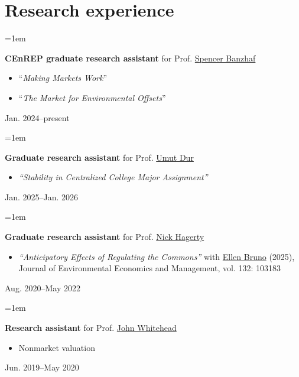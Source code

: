 \documentclass[12pt]{article}
\newenvironment{highlightsforbulletentries}{
	\begin{itemize}[
		topsep=0.10 cm,
		partopsep=0pt,
		leftmargin=20pt,
		]
	\setlength{\parsep}{0.10cm}\setlength{\itemsep}{-2pt}
	}{
	\end{itemize}
}
\newenvironment{twocolentry}[2][]{%
	\par\noindent\def\secondColumn{#2}%
	\begin{minipage}[t]{\linewidth-5.1cm}\raggedright\hangindent=1em\hangafter=1\relax%
	}
	{%
		\end{minipage}\hfill%
		\begin{minipage}[t]{5cm}\raggedleft\secondColumn\end{minipage}\par\smallskip
	}
\begin{document}
\section{Research experience}

\begin{twocolentry}
    {Jan. 2024--present}
    \textbf{CEnREP graduate research assistant} for Prof. \href{https://spencerbanzhaf.wordpress.ncsu.edu/}{Spencer Banzhaf}
    \begin{highlightsforbulletentries}
        \item ``\emph{Making Markets Work}''
        \item ``\emph{The Market for Environmental Offsets}''
    \end{highlightsforbulletentries}
\end{twocolentry}


\begin{twocolentry}
    {Jan. 2025--Jan. 2026}
    \textbf{Graduate research assistant} for Prof. \href{https://sites.google.com/site/umutdur/home}{Umut Dur}
    \begin{highlightsforbulletentries}
        \item \emph{``Stability in Centralized College Major Assignment''}
    \end{highlightsforbulletentries}
\end{twocolentry}

\begin{twocolentry}
    {Aug. 2020--May 2022}
    \textbf{Graduate research assistant} for Prof. \href{https://www.nickhagerty.com/}{Nick Hagerty}
    \begin{highlightsforbulletentries}
        \item \emph{``Anticipatory Effects of Regulating the Commons''} with \href{https://ellen-bruno.com/}{Ellen Bruno} (2025), Journal of Environmental Economics and Management, vol. 132: 103183
    \end{highlightsforbulletentries}
\end{twocolentry}

\begin{twocolentry}
    {Jun. 2019--May 2020}
    \textbf{Research assistant} for Prof. \href{https://economics.appstate.edu/directory/john-whitehead-phd}{John Whitehead}
    \begin{highlightsforbulletentries}
        \item Nonmarket valuation
    \end{highlightsforbulletentries}
\end{twocolentry}
\end{document}
